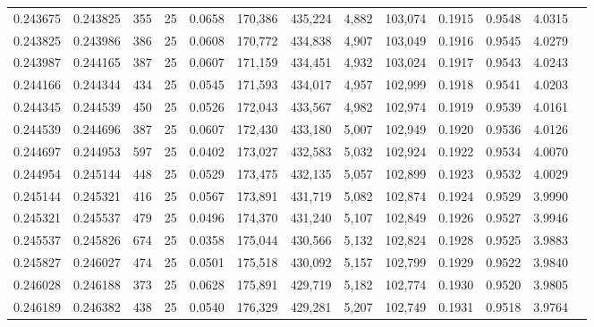 \begin{tabular}{rrrrrrrrrrrrr}
0.243675 & 0.243825 &   355 &  25 &                                     0.0658 & 170,386 & 435,224 &   4,882 & 103,074 & 0.1915 & 0.9548 & 4.0315 \\
0.243825 & 0.243986 &   386 &  25 &                                     0.0608 & 170,772 & 434,838 &   4,907 & 103,049 & 0.1916 & 0.9545 & 4.0279 \\
0.243987 & 0.244165 &   387 &  25 &                                     0.0607 & 171,159 & 434,451 &   4,932 & 103,024 & 0.1917 & 0.9543 & 4.0243 \\
0.244166 & 0.244344 &   434 &  25 &                                     0.0545 & 171,593 & 434,017 &   4,957 & 102,999 & 0.1918 & 0.9541 & 4.0203 \\
0.244345 & 0.244539 &   450 &  25 &                                     0.0526 & 172,043 & 433,567 &   4,982 & 102,974 & 0.1919 & 0.9539 & 4.0161 \\
0.244539 & 0.244696 &   387 &  25 &                                     0.0607 & 172,430 & 433,180 &   5,007 & 102,949 & 0.1920 & 0.9536 & 4.0126 \\
0.244697 & 0.244953 &   597 &  25 &                                     0.0402 & 173,027 & 432,583 &   5,032 & 102,924 & 0.1922 & 0.9534 & 4.0070 \\
0.244954 & 0.245144 &   448 &  25 &                                     0.0529 & 173,475 & 432,135 &   5,057 & 102,899 & 0.1923 & 0.9532 & 4.0029 \\
0.245144 & 0.245321 &   416 &  25 &                                     0.0567 & 173,891 & 431,719 &   5,082 & 102,874 & 0.1924 & 0.9529 & 3.9990 \\
0.245321 & 0.245537 &   479 &  25 &                                     0.0496 & 174,370 & 431,240 &   5,107 & 102,849 & 0.1926 & 0.9527 & 3.9946 \\
0.245537 & 0.245826 &   674 &  25 &                                     0.0358 & 175,044 & 430,566 &   5,132 & 102,824 & 0.1928 & 0.9525 & 3.9883 \\
0.245827 & 0.246027 &   474 &  25 &                                     0.0501 & 175,518 & 430,092 &   5,157 & 102,799 & 0.1929 & 0.9522 & 3.9840 \\
0.246028 & 0.246188 &   373 &  25 &                                     0.0628 & 175,891 & 429,719 &   5,182 & 102,774 & 0.1930 & 0.9520 & 3.9805 \\
0.246189 & 0.246382 &   438 &  25 &                                     0.0540 & 176,329 & 429,281 &   5,207 & 102,749 & 0.1931 & 0.9518 & 3.9764 \\

\end{tabular}
